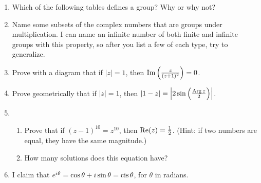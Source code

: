 \documentclass[../gatm.tex]{subfiles}
\begin{document}
\begin{enumerate}
\item Which of the following tables defines a group? Why or why not?
\begin{enumerate}
\end{enumerate}
\item Name some subsets of the complex numbers that are groups under multiplication. I can name an infinite number of both finite and infinite groups with this property, so after you list a few of each type, try to generalize.
\item Prove with a diagram that if $|z|=1$, then $\operatorname{Im}\left(\frac{z}{(z+1)^2}\right)=0$.
\item Prove geometrically that if $|z|=1$, then $|1-z|=\left|2\sin\left(\frac{\operatorname{Arg} z}{2}\right)\right|$.
\item \begin{enumerate}
\item Prove that if $(z-1)^{10}=z^{10}$, then $\operatorname{Re} (z) = \frac{1}{2}$. (Hint: if two numbers are equal, they have the same magnitude.)
\item How many solutions does this equation have?
\end{enumerate}
\item I claim that $e^{i\theta}=\cos\theta + i\sin\theta = \operatorname{cis}\theta$, for $\theta$ in radians.


\end{enumerate}
\end{document}
